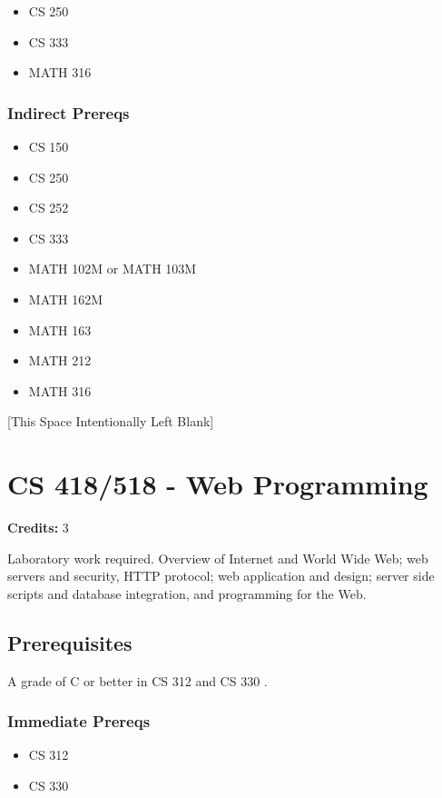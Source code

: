 \documentclass[]{article}
\providecommand{\tightlist}{%
  \setlength{\itemsep}{0pt}\setlength{\parskip}{0pt}}
\newcommand{\pagebreakhere}{
\vspace*{\fill}
\begin{center}
[This Space Intentionally Left Blank]
\end{center}
\vspace*{\fill}
\newpage
}
\begin{document}
\begin{itemize}
\tightlist
\item
  CS 250
\item
  CS 333
\item
  MATH 316
\end{itemize}

\subsubsection{Indirect Prereqs}\label{indirect-prereqs-20}

\begin{itemize}
\tightlist
\item
  CS 150
\item
  CS 250
\item
  CS 252
\item
  CS 333
\item
  MATH 102M or MATH 103M
\item
  MATH 162M
\item
  MATH 163
\item
  MATH 212
\item
  MATH 316
\end{itemize}

\pagebreakhere
\section{CS 418/518 - Web
Programming}\label{cs-418518---web-programming}

\textbf{Credits:} 3

Laboratory work required. Overview of Internet and World Wide Web; web
servers and security, HTTP protocol; web application and design; server
side scripts and database integration, and programming for the Web.

\subsection{Prerequisites}\label{prerequisites-29}

A grade of C or better in CS 312 and CS 330 .

\subsubsection{Immediate Prereqs}\label{immediate-prereqs-21}

\begin{itemize}
\tightlist
\item
  CS 312
\item
  CS 330
\end{itemize}
\end{document}
